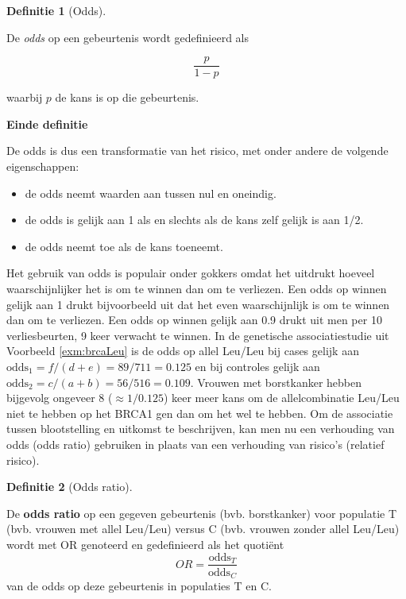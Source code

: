 \documentclass[
  12pt,dutch]{book}
\theoremstyle{definition}
\newtheorem{definition}{Definitie}[chapter]
\theoremstyle{definition}
\theoremstyle{definition}
\theoremstyle{definition}
\theoremstyle{remark}
\begin{document}
\begin{definition}[Odds]
\protect\hypertarget{def:unnamed-chunk-112}{}\label{def:unnamed-chunk-112}~
\end{definition}

De \emph{odds} op een gebeurtenis wordt gedefinieerd als

\begin{equation*}
\frac{p}{1-p}
\end{equation*}

waarbij \(p\) de kans is op die gebeurtenis.

\textbf{Einde definitie}

De odds is dus een transformatie van het risico, met onder andere de
volgende eigenschappen:

\begin{itemize}
\item
  de odds neemt waarden aan tussen nul en oneindig.
\item
  de odds is gelijk aan 1 als en slechts als de kans zelf gelijk is aan
  1/2.
\item
  de odds neemt toe als de kans toeneemt.
\end{itemize}

Het gebruik van odds is populair onder gokkers omdat het uitdrukt hoeveel
waarschijnlijker het is om te winnen dan om te verliezen. Een odds op winnen
gelijk aan 1 drukt bijvoorbeeld uit dat het even waarschijnlijk is om te
winnen dan om te verliezen. Een odds op winnen gelijk aan 0.9 drukt uit men
per 10 verliesbeurten, 9 keer verwacht te winnen. In de genetische associatiestudie uit Voorbeeld \ref{exm:brcaLeu}
is de odds op allel Leu/Leu bij cases gelijk aan
\(\mbox{odds}_1=f/(d+e)=89/711=0.125\) en bij controles gelijk aan \(\mbox{odds}_2=c/(a+b)=56/516=0.109\). Vrouwen met borstkanker hebben bijgevolg ongeveer 8 (\(\approx 1/0.125\)) keer meer kans om de allelcombinatie Leu/Leu niet te hebben op het BRCA1 gen dan om het wel te hebben.
Om de associatie tussen blootstelling
en uitkomst te beschrijven, kan men nu een verhouding van odds (odds ratio)
gebruiken in plaats van een verhouding van risico's (relatief risico).

\begin{definition}[Odds ratio]
\protect\hypertarget{def:unnamed-chunk-113}{}\label{def:unnamed-chunk-113}~
\end{definition}

De \textbf{odds ratio} op een gegeven gebeurtenis (bvb. borstkanker) voor populatie T (bvb. vrouwen met allel Leu/Leu) versus C (bvb. vrouwen zonder allel Leu/Leu) wordt met OR genoteerd en gedefinieerd als het quotiënt
\begin{equation*}
OR=\frac{\mbox{odds}_T}{\mbox{odds}_C}
\end{equation*}
van de odds op deze gebeurtenis in populaties T en C.
\end{document}
